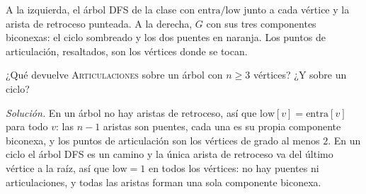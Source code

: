 \documentclass[11pt,letterpaper]{article}
\begin{document}
\begin{ejemplo}
\begin{center}
  \end{center}
  A la izquierda, el árbol DFS de la clase con
  $\text{entra}/\text{low}$ junto a cada vértice y la arista de
  retroceso punteada. A la derecha, $G$ con sus tres componentes
  biconexas: el ciclo sombreado y los dos puentes en naranja. Los
  puntos de articulación, resaltados, son los vértices donde se tocan.
\end{ejemplo}

\begin{ejercicio}
  ¿Qué devuelve \textsc{Articulaciones} sobre un árbol con $n \ge 3$
  vértices? ¿Y sobre un ciclo?

  \textit{Solución.} En un árbol no hay aristas de retroceso, así que
  $\text{low}[v] = \text{entra}[v]$ para todo $v$: las $n - 1$ aristas
  son puentes, cada una es su propia componente biconexa, y los puntos
  de articulación son los vértices de grado al menos $2$. En un ciclo
  el árbol DFS es un camino y la única arista de retroceso va del
  último vértice a la raíz, así que $\text{low} = 1$ en todos los
  vértices: no hay puentes ni articulaciones, y todas las aristas
  forman una sola componente biconexa.
\end{ejercicio}
\end{document}
